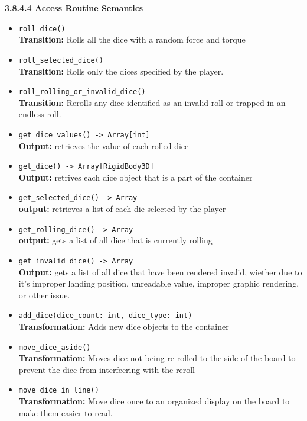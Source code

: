 \documentclass[12pt, titlepage]{article}
\begin{document}
\textbf{3.8.4.4 Access Routine Semantics}
\begin{itemize}
	\item \texttt{roll\_dice() }\\
    	\textbf{Transition:} Rolls all the dice with a random force and torque
	
	\item \texttt{roll\_selected\_dice() }\\
	\textbf{Transition:} Rolls only the dices specified by the player. 
	
	\item \texttt{roll\_rolling\_or\_invalid\_dice() }\\
	\textbf{Transition:} Rerolls any dice identified as an invalid roll or trapped in an endless roll.
	
	\item \texttt{get\_dice\_values() -> Array[int]}\\
	\textbf{Output:} retrieves the value of each rolled dice
	
	\item \texttt{get\_dice() -> Array[RigidBody3D] }\\
	\textbf{Output:} retrives each dice object that is a part of the container
	
	\item \texttt{get\_selected\_dice() -> Array }\\
	\textbf{output:} retrieves a list of each die selected by the player
	
	\item \texttt{get\_rolling\_dice() -> Array}\\
	\textbf{output:} gets a list of all dice that is currently rolling
	
	\item \texttt{get\_invalid\_dice() -> Array }\\
	\textbf{Output:} gets a list of all dice that have been rendered invalid, wiether due to it's improper landing position, unreadable value, improper graphic rendering, or other issue.
	
	\item \texttt{add\_dice(dice\_count: int, dice\_type: int)}\\
	\textbf{Transformation:} Adds new dice objects to the container
	
	\item \texttt{move\_dice\_aside() }\\
	\textbf{Transformation:} Moves dice not being re-rolled to the side of the board to prevent the dice from interfeering with the reroll
	
	\item \texttt{move\_dice\_in\_line() }\\
	\textbf{Transformation:} Move dice once to an organized display on the board to make them easier to read. 

	


\end{itemize}
\end{document}

